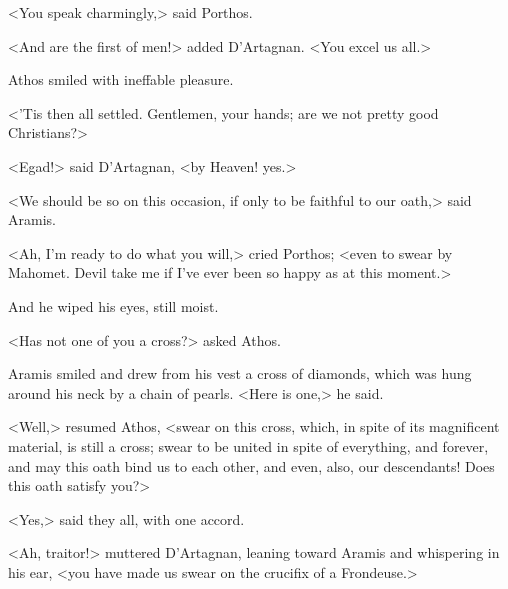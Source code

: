 <You speak charmingly,> said Porthos.

<And are the first of men!> added D'Artagnan. <You excel us all.>

Athos smiled with ineffable pleasure.

<'Tis then all settled. Gentlemen, your hands; are we not pretty good Christians?>

<Egad!> said D'Artagnan, <by Heaven! yes.>

<We should be so on this occasion, if only to be faithful to our oath,> said Aramis.

<Ah, I'm ready to do what you will,> cried Porthos; <even to swear by Mahomet. Devil take me if I've ever been so happy as at this moment.>

And he wiped his eyes, still moist.

<Has not one of you a cross?> asked Athos.

Aramis smiled and drew from his vest a cross of diamonds, which was hung around his neck by a chain of pearls. <Here is one,> he said.

<Well,> resumed Athos, <swear on this cross, which, in spite of its magnificent material, is still a cross; swear to be united in spite of everything, and forever, and may this oath bind us to each other, and even, also, our descendants! Does this oath satisfy you?>

<Yes,> said they all, with one accord.

<Ah, traitor!> muttered D'Artagnan, leaning toward Aramis and whispering in his ear, <you have made us swear on the crucifix of a Frondeuse.> 